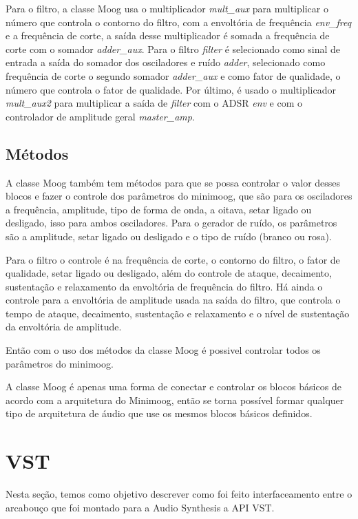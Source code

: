 \documentclass{article}
\begin{document}
Para o filtro, a classe Moog usa o multiplicador \emph{mult\_aux} para multiplicar o número que controla o contorno do filtro, com a envoltória de 
frequência \emph{env\_freq} e a frequência de corte, a saída desse multiplicador é somada a frequência de corte com o somador \emph{adder\_aux}.
Para o filtro \emph{filter} é selecionado como sinal de entrada a saída do somador dos osciladores e ruído \emph{adder}, selecionado como frequência 
de corte o segundo somador \emph{adder\_aux} e como fator de qualidade, o número que controla o fator de qualidade. Por último, é usado o multiplicador 
\emph{mult\_aux2} para multiplicar a saída de \emph{filter} com o ADSR \emph{env} e com o controlador de amplitude geral \emph{master\_amp}. 

  
\subsection{Métodos}
A classe Moog também tem métodos para que se possa controlar o valor desses blocos e fazer o controle dos parâmetros do minimoog, que são
 para os osciladores a frequência, amplitude, tipo de forma de onda, a oitava, setar ligado ou desligado, isso para ambos osciladores.
Para o gerador de ruído, os parâmetros são a amplitude, setar ligado ou desligado e o tipo de ruído (branco ou rosa).


Para o filtro o controle é na frequência de corte, o contorno do filtro, o fator de qualidade, setar ligado ou desligado, além do controle
 de ataque, decaimento, sustentação e relaxamento da envoltória de frequência do filtro.
Há ainda o controle para a envoltória de amplitude usada na saída do filtro, que controla o tempo de ataque, decaimento, sustentação e 
relaxamento e o nível de sustentação da envoltória de amplitude.


Então com o uso dos métodos da classe Moog é possivel controlar todos os parâmetros do minimoog.



A classe Moog é apenas uma forma de conectar e controlar os blocos básicos de acordo com a arquitetura do Minimoog, 
então se torna possível formar qualquer tipo de arquitetura 
 de áudio que use os mesmos blocos básicos definidos.




\section{VST}

Nesta seção, temos como objetivo 
descrever como foi feito interfaceamento entre o arcabouço que foi montado 
para a Audio Synthesis  a API VST.
\end{document}
